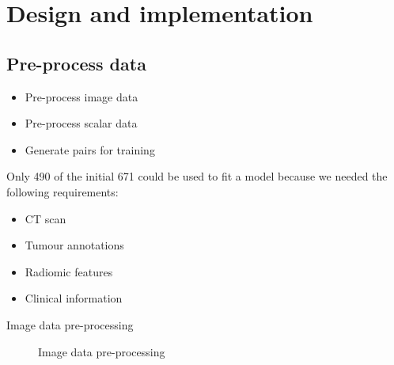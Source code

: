 
\section{Design and implementation}

\subsection{Pre-process data}
\begin{frame}{\insertsubsec}
  \begin{itemize}
    \item Pre-process image data
    \item Pre-process scalar data
    \item Generate pairs for training
  \end{itemize}

  \vspace{.5cm}
  Only 490 of the initial 671 could be used to fit a model because we needed the following 
  requirements:
  \begin{itemize}
    \item CT scan
    \item Tumour annotations
    \item Radiomic features
    \item Clinical information
  \end{itemize}
\end{frame}

\begin{frame}{Image data pre-processing}
  \begin{figure}
    \centering
    \scalebox{.6}{}
    \caption{Image data pre-processing}
  \end{figure}
\end{frame}

